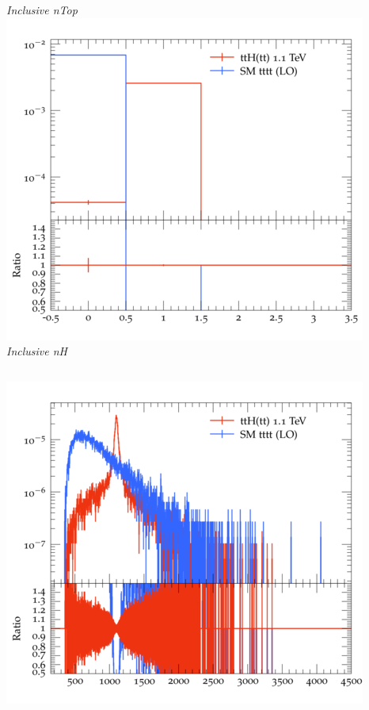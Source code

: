 \documentclass{beamer}
\begin{document}
\begin{frame}
\begin{columns}
\textit{\small Inclusive nTop}
\includegraphics[width=\textwidth]{../plots/ttH_1100/tttt_ttH/Inclusive_nH.png}\\
\textit{\small Inclusive nH}
\end{columns}
\begin{columns}
\includegraphics[width=\textwidth]{../plots/ttH_1100/tttt_ttH/Inclusive_InvM_ttbar12.png}\\

\end{columns}
\end{frame}
\end{document}
